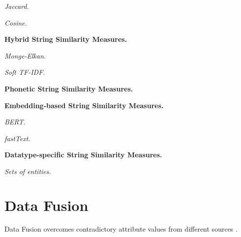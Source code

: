 \textit{Jaccard.}

\textit{Cosine.}

\textbf{Hybrid String Similarity Measures.}

\textit{Monge-Elkan.}

\textit{Soft TF-IDF.}

\textbf{Phonetic String Similarity Measures.}

\textbf{Embedding-based String Similarity Measures.}

\textit{BERT.}

\textit{fastText.}

\textbf{Datatype-specific String Similarity Measures.}

\textit{Sets of entities.}

\section{Data Fusion}

Data Fusion overcomes contradictory attribute values from different sources \cite{Bleiholder2009DataF}.